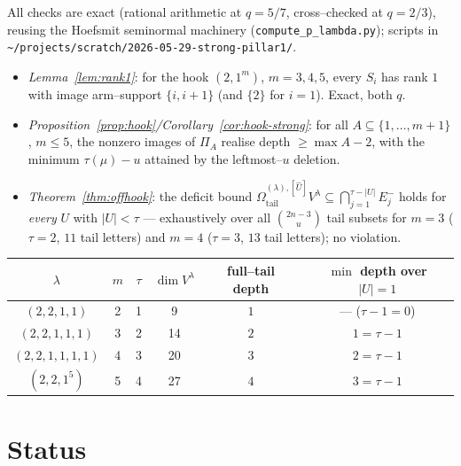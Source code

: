 \documentclass[11pt]{article}
\theoremstyle{definition}
\newcommand{\Vlam}{V^\lambda}
\newcommand{\Em}[1]{E^{-}_{#1}}
\newcommand{\OmU}{\Omega^{(\lambda),[\widehat U]}_{\mathrm{tail}}}
\begin{document}
All checks are exact (rational arithmetic at $q=5/7$, cross--checked at $q=2/3$), reusing
the Hoefsmit seminormal machinery (\texttt{compute\_p\_lambda.py}); scripts in
\texttt{\~{}/projects/scratch/2026-05-29-strong-pillar1/}.

\begin{itemize}[topsep=0.2em,itemsep=0.1em]
\item \emph{Lemma~\ref{lem:rank1}}: for the hook $(2,1^m)$, $m=3,4,5$, every $S_i$ has rank
   $1$ with image arm--support $\{i,i+1\}$ (and $\{2\}$ for $i=1$). Exact, both $q$.
\item \emph{Proposition~\ref{prop:hook}/Corollary~\ref{cor:hook-strong}}: for all
   $A\subseteq\{1,\dots,m+1\}$, $m\le5$, the nonzero images of $\Pi_A$ realise depth
   $\ge\max A-2$, with the minimum $\tau(\mu)-u$ attained by the leftmost--$u$ deletion.
\item \emph{Theorem~\ref{thm:offhook}}: the deficit bound $\OmU{}\Vlam\subseteq
   \bigcap_{j=1}^{\tau-|U|}\Em j$ holds for \emph{every} $U$ with $|U|<\tau$ ---
   exhaustively over all $\binom{2n-3}{u}$ tail subsets for $m=3$ ($\tau=2$, $11$ tail
   letters) and $m=4$ ($\tau=3$, $13$ tail letters); no violation.
\end{itemize}

\begin{center}
\renewcommand{\arraystretch}{1.15}
\begin{tabular}{c|c|c|c|c|c}
\toprule
$\lambda$ & $m$ & $\tau$ & $\dim\Vlam$ & full--tail depth & $\min$ depth over $|U|=1$\\
\midrule
$(2,2,1,1)$       & 2 & 1 & 9  & $1$ & --- ($\tau{-}1{=}0$)\\
$(2,2,1,1,1)$     & 3 & 2 & 14 & $2$ & $1=\tau-1$\\
$(2,2,1,1,1,1)$   & 4 & 3 & 20 & $3$ & $2=\tau-1$\\
$(2,2,1^5)$       & 5 & 4 & 27 & $4$ & $3=\tau-1$\\
\bottomrule
\end{tabular}
\end{center}

\section{Status}\label{sec:status}
\end{document}
